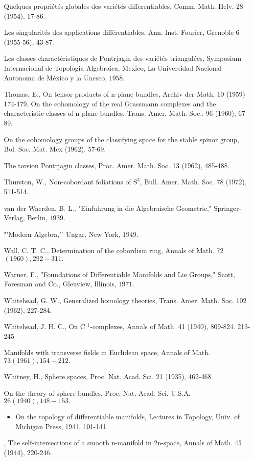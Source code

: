 \documentclass[10pt]{article}
\begin{document}
Quelques propriétés globales des variétés differentiables, Comm. Math. Helv. 28 (1954), 17-86.

Les singularités des applications différentiables, Ann. Inst. Fourier, Grenoble 6 (1955-56), 43-87.

Les classes charactéristiques de Pontrjagin des variétés triangulées, Symposium Internacional de Topologia Algebraica, Mexico, La Universidad Nacional Autonoma de México y la Unesco, $1958 .$

Thomas, E., On tensor products of $\mathrm{n}$-plane bundles, Archiv der Math. 10 (1959) 174-179. On the cohomology of the real Grassmann complexes and the characteristic classes of n-plane bundles, Trans. Amer. Math. Soc., 96 (1960), 67-89.

On the cohomology groups of the classifying space for the stable spinor group, Bol. Soc. Mat. Mex (1962), 57-69.

The torsion Pontrjagin classes, Proc. Amer. Math. Soc. 13 (1962), 485-488.

Thurston, W., Non-cobordant foliations of $\mathrm{S}^{3}$, Bull. Amer. Math. Soc. 78 (1972), 511-514.

van der Waerden, B. L., "Einfuhrung in die Algebraische Geometrie," Springer-Verlag, Berlin, $1939 .$

"'Modern Algebra,"' Ungar, New York, $1949 .$

Wall, C. T. C., Determination of the cobordism ring, Annals of Math. 72 $(1960), 292-311 .$

Warner, F., "Foundations of Differentiable Manifolds and Lie Groups," Scott, Foresman and Co., Glenview, Illinois, $1971 .$

Whitehead, G. W., Generalized homology theories, Trans. Amer. Math. Soc. 102 (1962), 227-284.

Whitehead, J. H. C., On C ${ }^{1}$-complexes, Annals of Math. 41 (1940), 809-824. 213-245

Manifolds with transverse fields in Euclidean space, Annals of Math. $73(1961), 154-212 .$

Whitney, H., Sphere spaces, Proc. Nat. Acad. Sci. 21 (1935), 462-468.

On the theory of sphere bundles, Proc. Nat. Acad. Sci. U.S.A. $26(1940), 148-153 .$

\begin{itemize}
  \item On the topology of differentiable manifolds, Lectures in Topology, Univ. of Michigan Press, 1941, 101-141.
\end{itemize}
, The self-intersections of a smooth $\mathrm{n}$-manifold in $2 \mathrm{n}$-space, Annals of Math. 45 (1944), 220-246.
\end{document}
